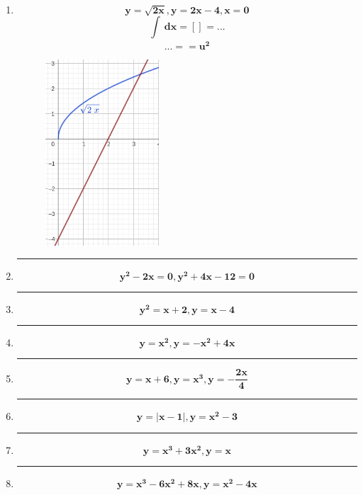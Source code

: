\documentclass[12pt]{article}
\begin{document}
\begin{itemize}
\begin{enumerate}
                \newpage\hrule
                \item \[\bm{y = \sqrt{2x}, y = 2x - 4, x = 0}\]
                    \[\bm{\int_{}^{}  \, dx} = \left[\right]_{}^{} = ...\]
                    \[... =   = \bm{u^2}\]
                    \begin{figure}[h!]
                        \centering
                        \includegraphics[width=0.4\textwidth]{img/t6-ej2-5.png}
                    \end{figure}

                \hrule
                \item \[\bm{y^2 - 2x = 0, y^2 + 4x - 12 = 0}\]

                \hrule
                \item \[\bm{y^2 = x + 2, y = x - 4}\]

                \hrule
                \item \[\bm{y = x^2, y = - x^2 + 4x}\]

                \hrule
                \item \[\bm{y = x + 6, y = x^3, y = - \frac{2x}{4}}\]
                
                \hrule
                \item \[\bm{y = \left|x - 1\right|, y = x^2 - 3}\]
                
                \hrule
                \item \[\bm{y = x^3 + 3x^2, y = x}\]
                
                \hrule
                \item \[\bm{y = x^3 - 6x^2 + 8x, y = x^2 - 4x}\]

            \end{enumerate}
        

\end{itemize}
\end{document}
